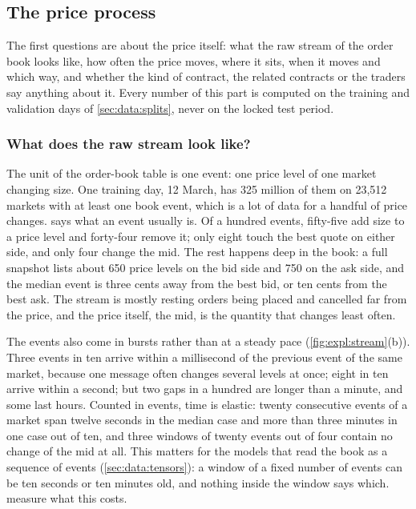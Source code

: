\subsection{The price process}
\label{sec:expl:price}

The first questions are about the price itself: what the raw stream of the order book
looks like, how often the price moves, where it sits, when it moves and which way, and
whether the kind of contract, the related contracts or the traders say anything about
it.  Every number of this part is computed on the training and validation days of
\cref{sec:data:splits}, never on the locked test period.

\subsubsection{What does the raw stream look like?}
\label{sec:expl:stream}

The unit of the order-book table is one event: one price level of one market changing
size.  One training day, 12 March, has 325 million of them on 23{,}512 markets with at least one
book event, which is a
lot of data for a handful of price changes.   says what an event
usually is.  Of a hundred events, fifty-five add size to a price level and forty-four
remove it; only eight touch the best quote on either side, and only four change the mid.
The rest happens deep in the book: a full snapshot lists about 650 price levels on the bid
side and 750 on the ask side, and the median event is three cents away from the best bid, or ten
cents from the best ask.  The stream is mostly resting orders being placed and cancelled
far from the price, and the price itself, the mid, is the quantity that changes least
often.

The events also come in bursts rather than at a steady pace (\cref{fig:expl:stream}(b)).
Three events in ten arrive within a millisecond of the previous event of the same market,
because one message often changes several levels at once; eight in ten arrive within a
second; but two gaps in a hundred are longer than a minute, and some last hours.  Counted
in events, time is elastic: twenty consecutive events of a market span twelve seconds in
the median case and more than three minutes in one case out of ten, and three windows of
twenty events out of four contain no change of the mid at all.  This matters for the
models that read the book as a sequence of events (\cref{sec:data:tensors}): a window of a
fixed number of events can be ten seconds or ten minutes old, and nothing inside the
window says which.   measure what this costs.

